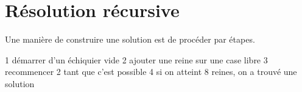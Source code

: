 \section*{Résolution récursive}

Une manière de construire une solution est de procéder par étapes.

1 démarrer d'un échiquier vide
2 ajouter une reine sur une case libre
3 recommencer 2 tant que c'est possible
4 si on atteint 8 reines, on a trouvé une solution



